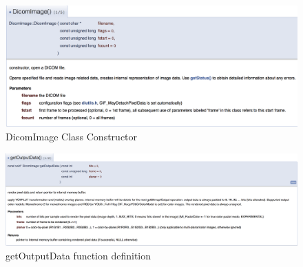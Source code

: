 \begin{figure}[ht]
\centering
\includegraphics[width = 0.95\hsize]{./figures/DicomImageConstructor}
\caption{DicomImage Class Constructor}
\end{figure}


\begin{figure}[ht]
\centering
\includegraphics[width = 0.95\hsize]{./figures/getOutputData}
\caption{getOutputData function definition}
\end{figure}